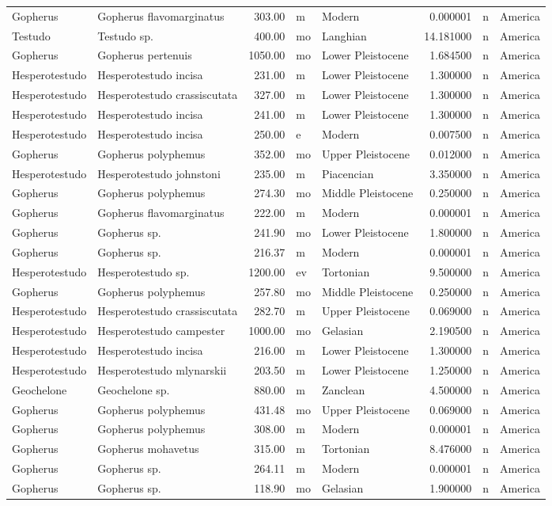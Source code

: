 \begin{landscape}
\begin{longtable}[]{@{}llrllrll@{}}
	Gopherus & Gopherus flavomarginatus & 303.00 & m & Modern & 0.000001 & n
	& America\tabularnewline
	Testudo & Testudo sp. & 400.00 & mo & Langhian & 14.181000 & n &
	America\tabularnewline
	Gopherus & Gopherus pertenuis & 1050.00 & mo & Lower Pleistocene &
	1.684500 & n & America\tabularnewline
	Hesperotestudo & Hesperotestudo incisa & 231.00 & m & Lower Pleistocene
	& 1.300000 & n & America\tabularnewline
	Hesperotestudo & Hesperotestudo crassiscutata & 327.00 & m & Lower
	Pleistocene & 1.300000 & n & America\tabularnewline
	Hesperotestudo & Hesperotestudo incisa & 241.00 & m & Lower Pleistocene
	& 1.300000 & n & America\tabularnewline
	Hesperotestudo & Hesperotestudo incisa & 250.00 & e & Modern & 0.007500
	& n & America\tabularnewline
	Gopherus & Gopherus polyphemus & 352.00 & mo & Upper Pleistocene &
	0.012000 & n & America\tabularnewline
	Hesperotestudo & Hesperotestudo johnstoni & 235.00 & m & Piacencian &
	3.350000 & n & America\tabularnewline
	Gopherus & Gopherus polyphemus & 274.30 & mo & Middle Pleistocene &
	0.250000 & n & America\tabularnewline
	Gopherus & Gopherus flavomarginatus & 222.00 & m & Modern & 0.000001 & n
	& America\tabularnewline
	Gopherus & Gopherus sp. & 241.90 & mo & Lower Pleistocene & 1.800000 & n
	& America\tabularnewline
	Gopherus & Gopherus sp. & 216.37 & m & Modern & 0.000001 & n &
	America\tabularnewline
	Hesperotestudo & Hesperotestudo sp. & 1200.00 & ev & Tortonian &
	9.500000 & n & America\tabularnewline
	Gopherus & Gopherus polyphemus & 257.80 & mo & Middle Pleistocene &
	0.250000 & n & America\tabularnewline
	Hesperotestudo & Hesperotestudo crassiscutata & 282.70 & m & Upper
	Pleistocene & 0.069000 & n & America\tabularnewline
	Hesperotestudo & Hesperotestudo campester & 1000.00 & mo & Gelasian &
	2.190500 & n & America\tabularnewline
	Hesperotestudo & Hesperotestudo incisa & 216.00 & m & Lower Pleistocene
	& 1.300000 & n & America\tabularnewline
	Hesperotestudo & Hesperotestudo mlynarskii & 203.50 & m & Lower
	Pleistocene & 1.250000 & n & America\tabularnewline
	Geochelone & Geochelone sp. & 880.00 & m & Zanclean & 4.500000 & n &
	America\tabularnewline
	Gopherus & Gopherus polyphemus & 431.48 & mo & Upper Pleistocene &
	0.069000 & n & America\tabularnewline
	Gopherus & Gopherus polyphemus & 308.00 & m & Modern & 0.000001 & n &
	America\tabularnewline
	Gopherus & Gopherus mohavetus & 315.00 & m & Tortonian & 8.476000 & n &
	America\tabularnewline
	Gopherus & Gopherus sp. & 264.11 & m & Modern & 0.000001 & n &
	America\tabularnewline
	Gopherus & Gopherus sp. & 118.90 & mo & Gelasian & 1.900000 & n &
	America\tabularnewline

\end{longtable}
\end{landscape}
